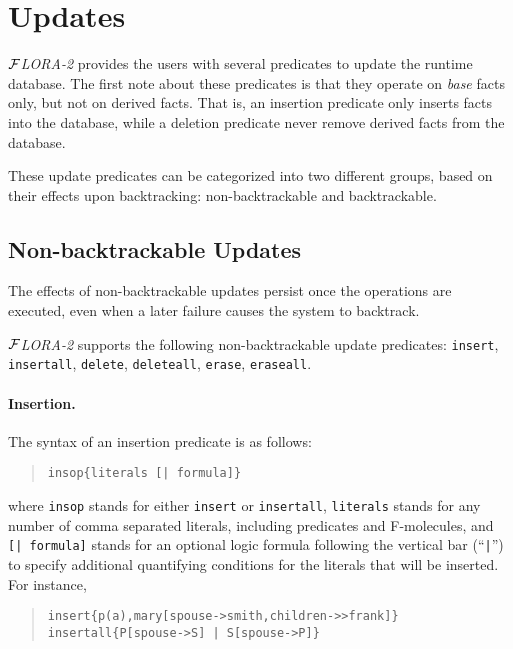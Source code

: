 \documentclass[11pt]{article}
\newcommand{\FLORA}{{\mbox{${\cal F}${\small\it LORA}\rm\emph{-2}}}\xspace}
\begin{document}
\section{Updates}\label{sec-updates}


%
\FLORA provides the users with several predicates to update the runtime
database. The first note about these predicates is that they operate
on \emph{base} facts only, but not on derived facts. That is, an
insertion predicate only inserts facts into the database, while a
deletion predicate never remove derived facts from the database.

These update predicates can be categorized into two different groups,
based on their effects upon backtracking: non-backtrackable and
backtrackable.


\subsection{Non-backtrackable Updates} \label{sec:non-backtrackable-updates}


%
The effects of non-backtrackable updates persist once the operations are
executed, even when a later failure causes the system to backtrack.

\FLORA supports the following non-backtrackable update predicates:
{\tt insert}, {\tt insertall}, {\tt delete}, {\tt deleteall},
{\tt erase}, {\tt eraseall}.

%
\paragraph{Insertion.} The syntax of an insertion predicate is as follows:
\begin{quote}
\begin{verbatim}
insop{literals [| formula]}
\end{verbatim}
\end{quote}
where {\tt insop} stands for either {\tt insert} or {\tt insertall},
{\tt literals} stands for any number of comma separated literals,
including predicates and \mbox{F-molecules}, and {\tt [| formula]}
stands for an optional logic formula following the vertical bar
(``{\tt |}'') to specify additional quantifying conditions for the
literals that will be inserted. For instance,
\begin{quote}
\begin{verbatim}
insert{p(a),mary[spouse->smith,children->>frank]}
insertall{P[spouse->S] | S[spouse->P]}
\end{verbatim}
\end{quote}
\end{document}
